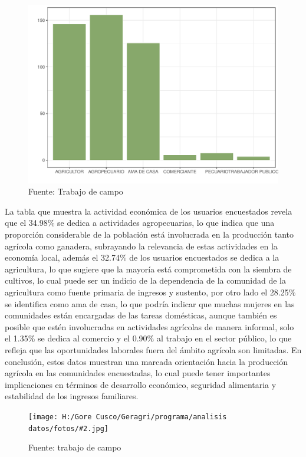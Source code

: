 \documentclass{article}\usepackage[]{graphicx}\usepackage[table]{xcolor}
\makeatletter
\def\maxwidth{ %
  \ifdim\Gin@nat@width>\linewidth
    \linewidth
  \else
    \Gin@nat@width
  \fi
}
\newenvironment{knitrout}{}{} %
\newenvironment{fotos}[2]
{\begin{figure}[H]
	\centering
	\caption{#1}
	\texttt{[image: H:/Gore Cusco/Geragri/programa/analisis datos/fotos/\#2.jpg]}
	\caption*{Fuente: trabajo de campo}}
{\end{figure}}
\makeatother
\begin{document}
\begin{figure}[H]
  \centering
  \caption{Actividad economica a la que se dedica}
\begin{knitrout}
\color{fgcolor}
\includegraphics[width=\maxwidth]{figure/fig_ocho-1} 
\end{knitrout}
  \caption*{Fuente: Trabajo de campo}
\end{figure}
La tabla que muestra la actividad económica de los usuarios encuestados revela que el 34.98\% se dedica a actividades agropecuarias, lo que indica que una proporción considerable de la población está involucrada en la producción tanto agrícola como ganadera, subrayando la relevancia de estas actividades en la economía local, además el 32.74\% de los usuarios encuestados se dedica a la agricultura, lo que sugiere que la mayoría está comprometida con la siembra de cultivos, lo cual puede ser un indicio de la dependencia de la comunidad de la agricultura como fuente primaria de ingresos y sustento, por otro lado el 28.25\% se identifica como ama de casa, lo que podría indicar que muchas mujeres en las comunidades están encargadas de las tareas domésticas, aunque también es posible que estén involucradas en actividades agrícolas de manera informal, solo el 1.35\% se dedica al comercio y el 0.90\% al trabajo en el sector público, lo que refleja que las oportunidades laborales fuera del ámbito agrícola son limitadas. En conclusión, estos datos muestran una marcada orientación hacia la producción agrícola en las comunidades encuestadas, lo cual puede tener importantes implicaciones en términos de desarrollo económico, seguridad alimentaria y estabilidad de los ingresos familiares.
\begin{fotos}
{Aplicacion de encuestas en el area de influencia}{6}
\end{fotos}
\end{document}
